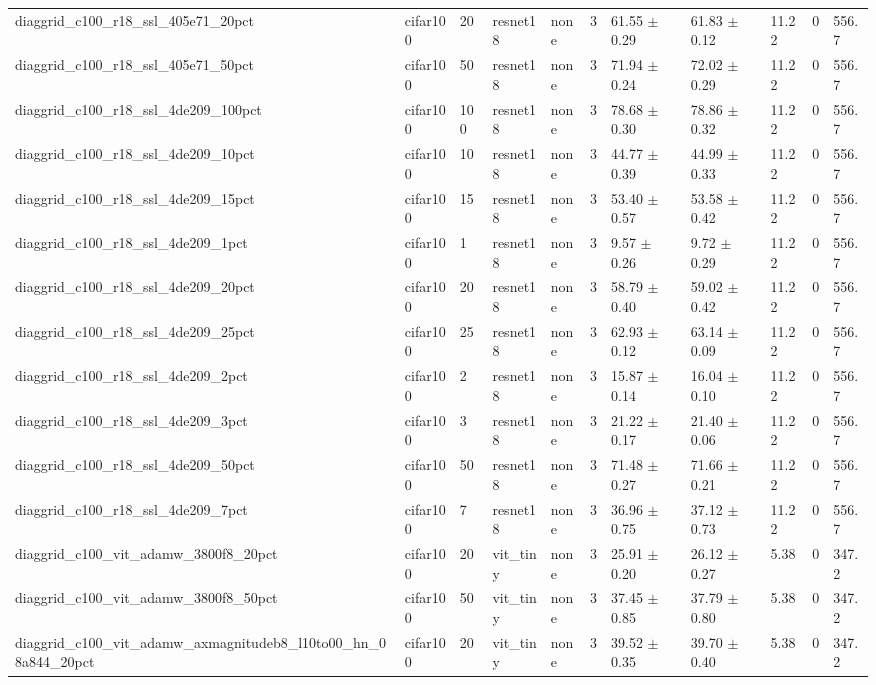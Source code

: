 \begin{tabular}{lllllllllll}
diaggrid_c100_r18_ssl_405e71_20pct & cifar100 & 20 & resnet18 & none & 3 & 61.55 $\pm$ 0.29 & 61.83 $\pm$ 0.12 & 11.22 & 0 & 556.7 \\
diaggrid_c100_r18_ssl_405e71_50pct & cifar100 & 50 & resnet18 & none & 3 & 71.94 $\pm$ 0.24 & 72.02 $\pm$ 0.29 & 11.22 & 0 & 556.7 \\
diaggrid_c100_r18_ssl_4de209_100pct & cifar100 & 100 & resnet18 & none & 3 & 78.68 $\pm$ 0.30 & 78.86 $\pm$ 0.32 & 11.22 & 0 & 556.7 \\
diaggrid_c100_r18_ssl_4de209_10pct & cifar100 & 10 & resnet18 & none & 3 & 44.77 $\pm$ 0.39 & 44.99 $\pm$ 0.33 & 11.22 & 0 & 556.7 \\
diaggrid_c100_r18_ssl_4de209_15pct & cifar100 & 15 & resnet18 & none & 3 & 53.40 $\pm$ 0.57 & 53.58 $\pm$ 0.42 & 11.22 & 0 & 556.7 \\
diaggrid_c100_r18_ssl_4de209_1pct & cifar100 & 1 & resnet18 & none & 3 & 9.57 $\pm$ 0.26 & 9.72 $\pm$ 0.29 & 11.22 & 0 & 556.7 \\
diaggrid_c100_r18_ssl_4de209_20pct & cifar100 & 20 & resnet18 & none & 3 & 58.79 $\pm$ 0.40 & 59.02 $\pm$ 0.42 & 11.22 & 0 & 556.7 \\
diaggrid_c100_r18_ssl_4de209_25pct & cifar100 & 25 & resnet18 & none & 3 & 62.93 $\pm$ 0.12 & 63.14 $\pm$ 0.09 & 11.22 & 0 & 556.7 \\
diaggrid_c100_r18_ssl_4de209_2pct & cifar100 & 2 & resnet18 & none & 3 & 15.87 $\pm$ 0.14 & 16.04 $\pm$ 0.10 & 11.22 & 0 & 556.7 \\
diaggrid_c100_r18_ssl_4de209_3pct & cifar100 & 3 & resnet18 & none & 3 & 21.22 $\pm$ 0.17 & 21.40 $\pm$ 0.06 & 11.22 & 0 & 556.7 \\
diaggrid_c100_r18_ssl_4de209_50pct & cifar100 & 50 & resnet18 & none & 3 & 71.48 $\pm$ 0.27 & 71.66 $\pm$ 0.21 & 11.22 & 0 & 556.7 \\
diaggrid_c100_r18_ssl_4de209_7pct & cifar100 & 7 & resnet18 & none & 3 & 36.96 $\pm$ 0.75 & 37.12 $\pm$ 0.73 & 11.22 & 0 & 556.7 \\
diaggrid_c100_vit_adamw_3800f8_20pct & cifar100 & 20 & vit_tiny & none & 3 & 25.91 $\pm$ 0.20 & 26.12 $\pm$ 0.27 & 5.38 & 0 & 347.2 \\
diaggrid_c100_vit_adamw_3800f8_50pct & cifar100 & 50 & vit_tiny & none & 3 & 37.45 $\pm$ 0.85 & 37.79 $\pm$ 0.80 & 5.38 & 0 & 347.2 \\
diaggrid_c100_vit_adamw_axmagnitudeb8_l10to00_hn_08a844_20pct & cifar100 & 20 & vit_tiny & none & 3 & 39.52 $\pm$ 0.35 & 39.70 $\pm$ 0.40 & 5.38 & 0 & 347.2 \\

\end{tabular}
